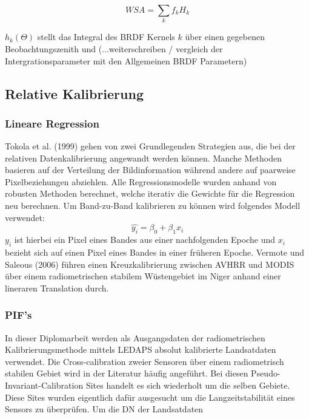 \documentclass[11pt]{report}
\begin{document}
\begin{equation}
WSA = \sum_{k}f_kH_k
\end{equation}

$h_k(\Theta)$  stellt das Integral des BRDF Kernels $k$ über einen gegebenen Beobachtungszenith und (...weiterschreiben / vergleich der Intergrationsparameter mit den Allgemeinen BRDF Parametern)




\subsection{Relative Kalibrierung}
\subsubsection{Lineare Regression}
Tokola et al. (1999) gehen von zwei Grundlegenden Strategien aus, die bei der relativen Datenkalibrierung angewandt werden können. Manche Methoden basieren auf der Verteilung der Bildinformation während andere auf paarweise Pixelbeziehungen abziehlen. Alle Regressionsmodelle wurden anhand von robusten Methoden berechnet, welche iterativ die Gewichte für die Regression neu berechnen. Um Band-zu-Band kalibrieren zu können wird folgendes Modell verwendet:
\begin{equation}
\hat{y_i}=\beta_0+\beta_1x_i
\end{equation}
$y_i$ ist hierbei ein Pixel eines Bandes aus einer nachfolgenden Epoche und $x_i$ bezieht sich auf einen Pixel eines Bandes in einer früheren Epoche. Vermote und Saleous (2006) führen einen Kreuzkalibrierung zwischen AVHRR und MODIS über einem radiometrischen stabilem Wüstengebiet im Niger anhand einer lineraren Translation durch.


\subsubsection{PIF's}

In dieser Diplomarbeit werden als Ausgangsdaten der radiometrischen Kalibrierungsmethode mittels LEDAPS absolut kalibrierte Landsatdaten verwendet. 
Die Cross-calibration zweier Sensoren über einem radiometrisch stabilen Gebiet wird in der Literatur häufig angeführt. Bei diesen Pseudo-Invariant-Calibration Sites handelt es sich wiederholt um die selben Gebiete. Diese Sites wurden eigentlich dafür ausgesucht um die Langzeitstabilität eines Sensors zu überprüfen. Um die DN der Landsatdaten 


% 
\end{document}
